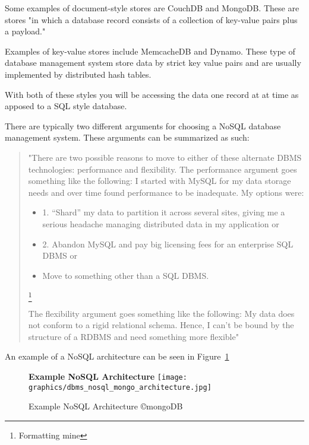 \documentclass[letterpaper, 12pt]{article}
\begin{document}
Some examples of document-style stores are CouchDB and MongoDB. These are stores
"in which a database record consists of a collection of key-value pairs plus a payload."
\cite{stonebraker2010sql}
\par\vspace{\baselineskip}
Examples of key-value stores include MemcacheDB and Dynamo. These type of database
management system store data by strict key value pairs and are usually implemented by
distributed hash tables.
\par\vspace{\baselineskip}
With both of these styles you will be accessing the data one record at
at time as apposed to a SQL style database.
\par\vspace{\baselineskip}
There are typically two different arguments for choosing a NoSQL database management
system. These arguments can be summarized as such:

\begin{quote}
"There are two possible reasons
to move to either of these alternate
DBMS technologies: performance and
flexibility.
The performance argument goes
something like the following: I started
with MySQL for my data storage needs
and over time found performance to be
inadequate. My options were:

\begin{itemize}
  \item 1. “Shard” my data to partition it
across several sites, giving me a serious
headache managing distributed data
in my application or
  \item 2. Abandon MySQL and pay big licensing
fees for an enterprise SQL
DBMS or
\item Move to something other
than a SQL DBMS.
\end{itemize}\footnote{Formatting mine}

The flexibility argument goes something
like the following: My data does
not conform to a rigid relational schema.
Hence, I can’t be bound by the
structure of a RDBMS and need something
more flexible"
\end{quote} \cite{stonebraker2010sql}
\par\vspace{\baselineskip}
An example of a NoSQL architecture can be seen in Figure~\ref{fig:nosqlDBMS_structure}
\begin{figure}
  \centering
  \label{fig:nosqlDBMS_structure}
  \textbf{Example NoSQL Architecture}
  \texttt{[image: graphics/dbms\_nosql\_mongo\_architecture.jpg]}
  \caption{Example NoSQL Architecture \copyright mongoDB   \citep{mongodb_architecture}}
\end{figure}
\end{document}
